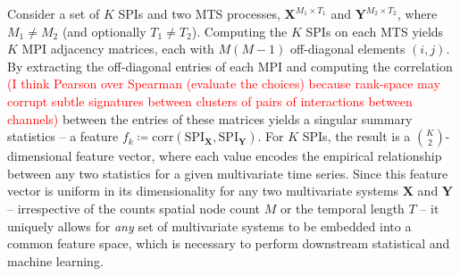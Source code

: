 Consider a set of $K$ SPIs and two MTS processes, $\mathbf{X}^{M_1 \times T_1}$ and $\mathbf{Y}^{M_2 \times T_2}$, where $M_1 \neq M_2$ (and optionally $T_1 \neq T_2$). Computing the $K$ SPIs on each MTS yields $K$ MPI adjacency matrices, each with $M(M-1)$ off-diagonal elements $(i, j)$. By extracting the off-diagonal entries of each MPI and computing the correlation \textcolor{red}{(I think Pearson over Spearman (evaluate the choices) because rank-space may corrupt subtle signatures between clusters of pairs of interactions between channels)} between the entries of these matrices yields a singular summary statistics -- a feature $f_k \coloneqq \mathrm{corr}(\mathrm{SPI}_{\mathbf{X}}, \mathrm{SPI}_{\mathbf{Y}})$. For $K$ SPIs, the result is a ${K \choose 2}$-dimensional feature vector, where each value encodes the empirical relationship between any two statistics for a given multivariate time series. Since this feature vector is uniform in its dimensionality for any two multivariate systems $\mathbf{X}$ and $\mathbf{Y}$ -- irrespective of the counts spatial node count $M$ or the temporal length $T$ -- it uniquely allows for \textit{any} set of multivariate systems to be embedded into a common feature space, which is necessary to perform downstream statistical and machine learning.

